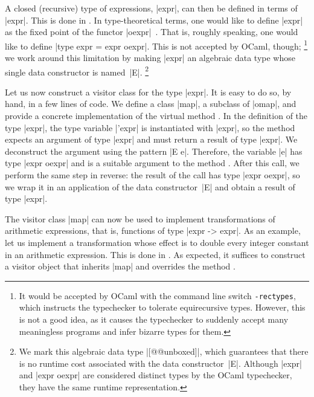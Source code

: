 \documentclass[11pt,a4paper,twoside]{article}
\begin{document}
A closed (recursive) type of expressions, \oc|expr|, can then be defined in
terms of \oc|expr|. This is done in . In type-theoretical
terms, one would like to define \oc|expr| as the fixed point of the functor
\oc|oexpr|~\cite{milewski-13}.
%
That is, roughly speaking, one would like to define \oc|type expr = expr oexpr|.
This is not accepted by OCaml, though;%
%
\footnote{It would be accepted by OCaml with the command line switch
  \texttt{-rectypes}, which instructs the typechecker to tolerate
  equirecursive types. However, this is not a good idea, as it causes
  the typechecker to suddenly accept many meaningless programs and infer
  bizarre types for them.}
%
we work around this limitation by making \oc|expr| an algebraic data type
whose single data constructor is named~\oc|E|.%
%
\footnote{We mark this algebraic data type \oc|[@@unboxed]|, which
  guarantees that there is no runtime cost associated with the
  data constructor~\oc|E|. Although \oc|expr| and \oc|expr oexpr| are
  considered distinct types by the OCaml typechecker, they have the same
  runtime representation.}

Let us now construct a visitor class for the type \oc|expr|. It is easy to
do so, by hand, in a few lines of code.%
%
%
%
We define a class \oc|map|, a subclass of \oc|omap|, and provide a concrete
implementation of the virtual method . In the definition
of the type \oc|expr|, the type variable \oc|'expr| is instantiated with
\oc|expr|, so the method  expects an argument of type
\oc|expr| and must return a result of type \oc|expr|. We deconstruct the
argument using the pattern \oc|E e|. Therefore, the variable \oc|e| has type
\oc|expr oexpr| and is a suitable argument to the method .
After this call, we perform the same step in reverse: the result of the call
has type \oc|expr oexpr|, so we wrap it in an application of the data
constructor~\oc|E| and obtain a result of type \oc|expr|.

The visitor class \oc|map| can now be used to implement transformations of
arithmetic expressions, that is, functions of type \oc|expr -> expr|. As an
example, let us implement a transformation whose effect is to double every
integer constant in an arithmetic expression. This is done in
. As expected, it suffices to construct a visitor
object that inherits \oc|map| and overrides the method
.
\end{document}
